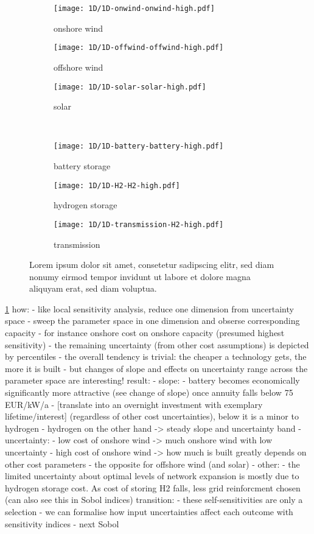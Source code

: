 \begin{figure}
    \begin{subfigure}[t]{0.32\textwidth}
        \caption{onshore wind}
        \texttt{[image: 1D/1D-onwind-onwind-high.pdf]}
    \end{subfigure}
    \begin{subfigure}[t]{0.32\textwidth}
        \caption{offshore wind}
        \texttt{[image: 1D/1D-offwind-offwind-high.pdf]}
    \end{subfigure}
    \begin{subfigure}[t]{0.32\textwidth}
        \caption{solar}
        \texttt{[image: 1D/1D-solar-solar-high.pdf]}
    \end{subfigure} \\
    \begin{subfigure}[t]{0.32\textwidth}
        \caption{battery storage}
        \texttt{[image: 1D/1D-battery-battery-high.pdf]}
    \end{subfigure}
    \begin{subfigure}[t]{0.32\textwidth}
        \caption{hydrogen storage}
        \texttt{[image: 1D/1D-H2-H2-high.pdf]}
    \end{subfigure}
    \begin{subfigure}[t]{0.32\textwidth}
        \caption{transmission}
        \texttt{[image: 1D/1D-transmission-H2-high.pdf]}
    \end{subfigure}
    \caption{Lorem ipsum dolor sit amet, consetetur sadipscing elitr, sed diam nonumy eirmod tempor invidunt ut labore et dolore magna aliquyam erat, sed diam voluptua.}
    \label{fig:sensitivity}
\end{figure}

\cref{fig:sensitivity}
how:
- like local sensitivity analysis, reduce one dimension from uncertainty space
- sweep the parameter space in one dimension and obserse corresponding capacity
- for instance onshore cost on onshore capacity (presumed highest sensitivity)
- the remaining uncertainty (from other cost assumptions) is depicted by percentiles
- the overall tendency is trivial: the cheaper a technology gets, the more it is built
- but changes of slope and effects on uncertainty range across the parameter space are interesting!
result:
- slope:
  - battery  becomes economically significantly more attractive (see change of slope) once annuity falls below 75 EUR/kW/a
  - [translate into an overnight investment with exemplary lifetime/interest] (regardless of other cost uncertainties), below it is a minor to hydrogen
  - hydrogen on the other hand -> steady slope and uncertainty band
- uncertainty:
  - low cost of onshore wind -> much onshore wind with low uncertainty
  - high cost of onshore wind -> how much is built greatly depends on other cost parameters
  - the opposite for offshore wind (and solar)
- other:
  - the limited uncertainty about optimal levels of network expansion is mostly due to hydrogen storage cost. As cost of storing H2 falls, less grid reinforcment chosen (can also see this  in Sobol indices)
transition:
- these self-sensitivities are only a selection
- we can formalise how input uncertainties affect each outcome with sensitivity indices
- next Sobol

